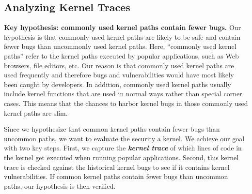 \subsection{Analyzing Kernel Traces}

{\bf Key hypothesis: commonly used kernel paths contain fewer bugs.}
Our hypothesis is that commonly used kernel paths are likely to be safe and contain fewer bugs 
than uncommonly used kernel paths. 
Here, ``commonly used kernel paths'' refer to the kernel paths executed by popular 
applications, such as Web browsers, file editors, etc. 
Our reason is that commonly used kernel paths are used
frequently and therefore bugs and vulnerabilities would have most likely
been caught by developers.  In addition, commonly used kernel paths usually 
include kernel functions that are used in normal ways rather than special 
corner cases. This means that the chances 
to harbor kernel bugs in those commonly used kernel paths are slim. 

Since we hypothesize that 
common kernel paths contain fewer bugs than uncommon paths, we want to 
evaluate the security a kernel. We achieve our goal with two key steps. First, we capture the 
\textbf{\textit{kernel trace}} of which lines of code in the kernel get executed when running 
popular applications. Second, this kernel trace is checked against the historical kernel 
bugs to see if it contains kernel vulnerabilities. If common kernel paths contain 
fewer bugs than uncommon paths, our hypothesis is then verified. 

